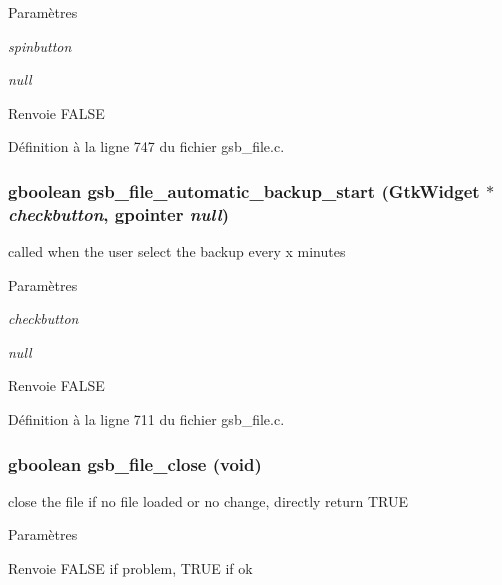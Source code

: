 \begin{DoxyParams}{Paramètres}
\item[{\em spinbutton}]\item[{\em null}]\end{DoxyParams}
\begin{DoxyReturn}{Renvoie}
FALSE 
\end{DoxyReturn}


Définition à la ligne 747 du fichier gsb\_\-file.c.

\subsubsection[{gsb\_\-file\_\-automatic\_\-backup\_\-start}]{\setlength{\rightskip}{0pt plus 5cm}gboolean gsb\_\-file\_\-automatic\_\-backup\_\-start (GtkWidget $\ast$ {\em checkbutton}, \/  gpointer {\em null})}\label{gsb__file_8c_a9e956c0079c7eba15147e2ae85c76442}
called when the user select the backup every x minutes


\begin{DoxyParams}{Paramètres}
\item[{\em checkbutton}]\item[{\em null}]\end{DoxyParams}
\begin{DoxyReturn}{Renvoie}
FALSE 
\end{DoxyReturn}


Définition à la ligne 711 du fichier gsb\_\-file.c.

\subsubsection[{gsb\_\-file\_\-close}]{\setlength{\rightskip}{0pt plus 5cm}gboolean gsb\_\-file\_\-close (void)}\label{gsb__file_8c_a74157bdabf438bfbda5a6040a5c1cc15}
close the file if no file loaded or no change, directly return TRUE


\begin{DoxyParams}{Paramètres}
\item[{\em }]\end{DoxyParams}
\begin{DoxyReturn}{Renvoie}
FALSE if problem, TRUE if ok 
\end{DoxyReturn}


